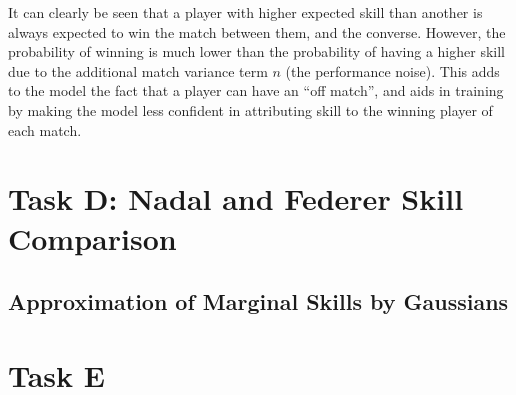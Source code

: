 \documentclass[11pt]{amsart}
\begin{document}
It can clearly be seen that a player with higher expected skill than another is always expected to win the match between them, and the converse. However, the probability of winning is much lower than the probability of having a higher skill due to the additional match variance term $n$ (the performance noise). This adds to the model the fact that a player can have an ``off match'', and aids in training by making the model less confident in attributing skill to the winning player of each match.


\section{Task D: Nadal and Federer Skill Comparison}
\subsection{Approximation of Marginal Skills by Gaussians}



\section{Task E}












\end{document}
